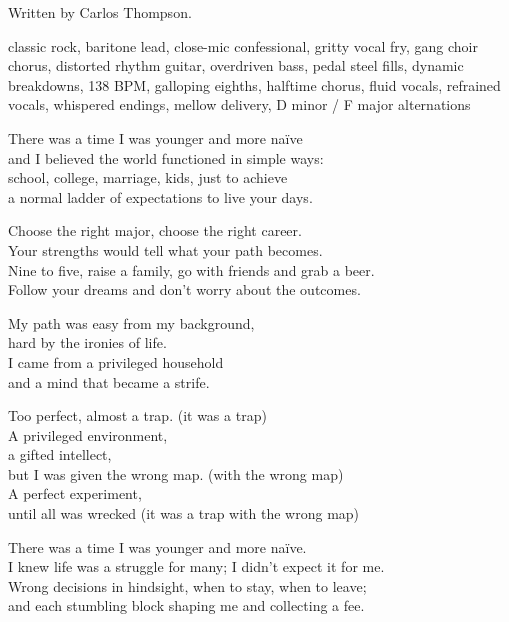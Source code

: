 
\begin{notes}
Written by Carlos Thompson.
\end{notes}
\begin{style}
classic rock, baritone lead, close-mic confessional, gritty vocal fry, gang choir chorus, distorted rhythm guitar, overdriven bass, pedal steel fills, dynamic breakdowns, 138 BPM, galloping eighths, halftime chorus, fluid vocals, refrained vocals, whispered endings, mellow delivery, D minor / F major alternations
\end{style}
\begin{lyrics}
There was a time I was younger and more naïve\\
and I believed the world functioned in simple ways:\\
school, college, marriage, kids, just to achieve\\
a normal ladder of expectations to live your days.

Choose the right major, choose the right career.\\
Your strengths would tell what your path becomes.\\
Nine to five, raise a family, go with friends and grab a beer.\\
Follow your dreams and don't worry about the outcomes.

My path was easy from my background,\\
hard by the ironies of life.\\
I came from a privileged household\\
and a mind that became a strife.

Too perfect, almost a trap. (it was a trap)\\
A privileged environment,\\
a gifted intellect,\\
but I was given the wrong map. (with the wrong map)\\
A perfect experiment,\\
until all was wrecked
(it was a trap with the wrong map)

There was a time I was younger and more naïve.\\
I knew life was a struggle for many; I didn't expect it for me.\\
Wrong decisions in hindsight, when to stay, when to leave;\\
and each stumbling block shaping me and collecting a fee.


\end{lyrics}
